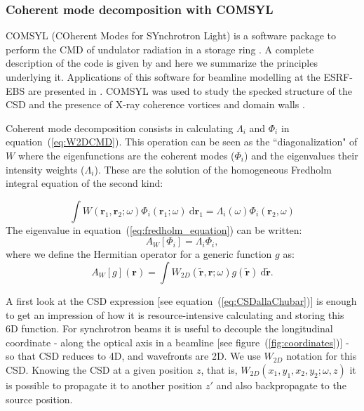 \documentclass[preprint]{iucr}
\newcommand{\inred}[1]{{\color{red}#1}}
\begin{document}
\subsubsection{Coherent mode decomposition with COMSYL\\}\label{sec:COMSYL} 
 COMSYL (COherent Modes for SYnchrotron Light) is a software package to perform the CMD of undulator radiation in a storage ring \cite{codeCOMSYL}. A complete description of the code is given by  and here we summarize \inred{the} principles underlying it. Applications of this software for beamline modelling at the ESRF-EBS are presented in \cite{glass2017, hierarchical}. COMSYL was used to study the specked structure of the CSD and the presence of X-ray coherence vortices and domain walls \cite{PaganinSanchezDelRio2019}.

Coherent mode decomposition consists in calculating $\Lambda_i$ and $\Phi_i$ in equation~(\ref{eq:W2DCMD}). This operation can be seen as the ``diagonalization" of $W$ where the eigenfunctions are the coherent modes ($\Phi_i$) and the eigenvalues their intensity weights ($\Lambda_i$). These are the solution of the homogeneous Fredholm integral equation of \inred{the} second kind:

\begin{equation}\label{eq:fredholm_equation}
\int W(\textbf{r}_1,\textbf{r}_2;\omega)
\Phi_i(\textbf{r}_1;\omega)~\text{d}\textbf{r}_1  = \Lambda_i(\omega) \Phi_i(\textbf{r}_2,\omega)
\end{equation}
The eigenvalue in equation~(\ref{eq:fredholm_equation}) can be written: 
\begin{equation}
A_{W}[\Phi_i] = \Lambda_i \Phi_i,
\end{equation}
where we define the Hermitian operator for a generic function $g$ as:
\begin{equation}\label{eq:Hermitian}
A_{W}[g](\textbf{r})  = \int W_{2D}(\tilde{\textbf{r}},\textbf{r};\omega) g(\tilde{\textbf{r}})~ \text{d}\tilde{\textbf{r}}.
\end{equation}

A first look at the CSD expression [see equation~(\ref{eq:CSDallaChubar})] is enough to get an impression of how it is resource-intensive calculating and storing this 6D function. For synchrotron beams it is useful to decouple the longitudinal coordinate - along the optical axis in a beamline [see figure~(\ref{fig:coordinates})] - so that CSD reduces to 4D, and wavefronts are 2D. We use $W_{2D}$ notation for this CSD. Knowing the CSD at a given position $z$, that is, $W_{2D}(x_1,y_1,x_2,y_2; \omega, z)$ it is possible to propagate it to another position $z'$ and also backpropagate to the source position.
\end{document}
